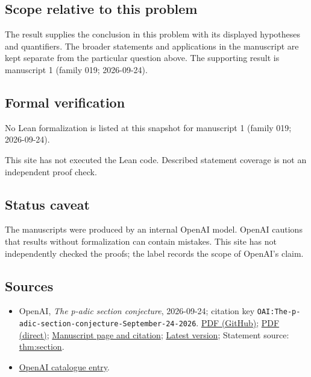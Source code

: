 \documentclass[11pt]{article}
\begin{document}
\subsection{Scope relative to this problem}
The result supplies the conclusion in this problem with its displayed hypotheses and quantifiers. The broader statements and applications in the manuscript are kept separate from the particular question above. The supporting result is manuscript 1 (family 019; 2026-09-24).

\subsection{Formal verification}
No Lean formalization is listed at this snapshot for manuscript 1 (family 019; 2026-09-24).

This site has not executed the Lean code. Described statement coverage is not an independent proof check.

\subsection{Status caveat}
The manuscripts were produced by an internal OpenAI model. OpenAI cautions that results without formalization can contain mistakes. This site has not independently checked the proofs; the label records the scope of OpenAI's claim.

\subsection{Sources}
\begin{itemize}
\item OpenAI, \emph{The p-adic section conjecture}, 2026-09-24; citation key \texttt{OAI:The-p-adic-section-conjecture-September-24-2026}. \href{https://github.com/openai/math/blob/adc7f1241b42e322a6451854ab7e4b4c146bf78a/preprints/The-p-adic-section-conjecture-September-24-2026/main.pdf}{PDF (GitHub)}; \href{https://github.com/openai/math/raw/adc7f1241b42e322a6451854ab7e4b4c146bf78a/preprints/The-p-adic-section-conjecture-September-24-2026/main.pdf}{PDF (direct)}; \href{https://github.com/openai/math/blob/adc7f1241b42e322a6451854ab7e4b4c146bf78a/preprints/The-p-adic-section-conjecture-September-24-2026/README.md}{Manuscript page and citation}; \href{https://github.com/openai/math/blob/main/preprints/The-p-adic-section-conjecture-September-24-2026/main.pdf}{Latest version}; Statement source: \href{https://github.com/openai/math/blob/adc7f1241b42e322a6451854ab7e4b4c146bf78a/preprints/The-p-adic-section-conjecture-September-24-2026/build/sections/01-introduction.tex\#L31}{thm:section}.
\item \href{https://github.com/openai/math/blob/adc7f1241b42e322a6451854ab7e4b4c146bf78a/CONTENTS.md}{OpenAI catalogue entry}.
\end{itemize}
\end{document}
